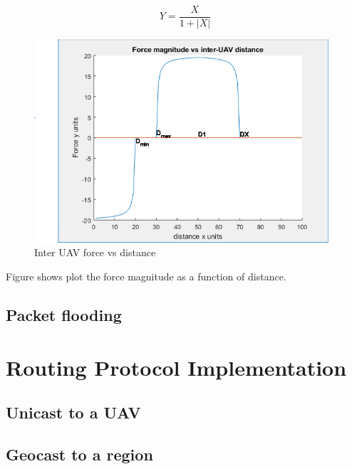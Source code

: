 \begin{equation}
    Y = \frac{X}{1 + |X|}
\end{equation}
\begin{figure}
\centering
\includegraphics[width=1\textwidth]{ncsuthesis-0.6/Chapter-4/figs/force_function}
\caption{Inter UAV force vs distance}
\label{fig:force_fn}
\end{figure}
Figure  shows plot the force magnitude as a function of distance.

\subsection{Packet flooding}
\section{Routing Protocol Implementation}
\subsection{Unicast to a UAV}
\subsection{Geocast to a region}
